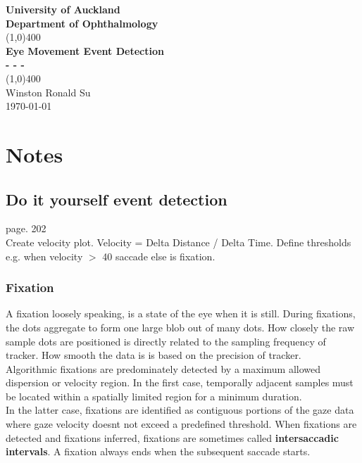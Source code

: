 \documentclass[12pt]{article}
\theoremstyle{definition}
\begin{document}
\begin{titlepage}
\begin{center}
\vspace*{1cm}
\Large{\textbf{University of Auckland}}\\
\Large{\textbf{Department of Ophthalmology}}\\
\vspace*{0.5cm}
\vfill
\line(1,0){400}\\
\huge{\textbf{Eye Movement Event Detection}}\\[3mm]
\Large{\textbf{- - - }}\\[1mm]
\line(1,0){400}\\
\vfill
Winston Ronald Su\\
\today\\

\end{center}
\end{titlepage}

\newpage
\section{Notes}
\subsection{Do it yourself event detection}
page. 202 \\

Create velocity plot. 
Velocity = Delta Distance / Delta Time. 
Define thresholds e.g. when velocity $>$ 40 saccade else is fixation. 

\subsubsection{Fixation}
A fixation loosely speaking, is a state of the eye when it is still.
During fixations, the dots aggregate to form one large blob out of many dots. How closely the raw sample dots are positioned is directly related to the sampling frequency of tracker. How smooth the data is is based on the precision of tracker.\\

Algorithmic fixations are predominately detected by a maximum allowed dispersion or velocity region. In the first case, temporally adjacent samples must be located within a spatially limited region for a minimum duration.\\

In the latter case, fixations are identified as contiguous portions of the gaze data where gaze velocity doesnt not exceed a predefined threshold. When fixations are detected and fixations inferred, fixations are sometimes called \textbf{intersaccadic intervals}. A fixation always ends when the subsequent saccade starts.\\
\end{document}
